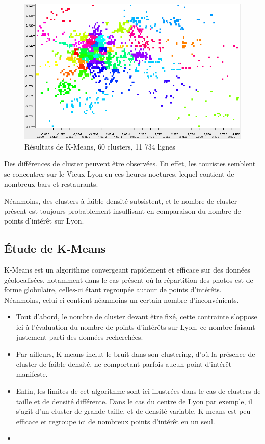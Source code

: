 \begin{figure}[H]
    \centering
    \includegraphics[width=\linewidth]{img/60_means_night.png}
    \caption{Résultats de K-Means, 60 clusters, 11 734 lignes}
\end{figure}

Des différences de cluster peuvent être observées. En effet, les touristes semblent se concentrer sur le Vieux Lyon en ces heures noctures, lequel contient de nombreux bars et restaurants.

Néanmoins, des clusters à faible densité subsistent, et le nombre de cluster présent est toujours probablement insuffisant en comparaison du nombre de points d'intérêt sur Lyon.


\subsection{Étude de K-Means}
K-Means est un algorithme convergeant rapidement et efficace sur des données géolocalisées, notamment dans le cas présent où la répartition des photos est de forme globulaire, celles-ci étant regroupée autour de points d'intérêts.\\

Néanmoins, celui-ci contient néanmoins un certain nombre d'inconvénients.

\begin{itemize}
\item Tout d'abord, le nombre de cluster devant être fixé, cette contrainte s'oppose ici à l'évaluation du nombre de points d'intérêts sur Lyon, ce nombre faisant justement parti des données recherchées.

\item Par ailleurs, K-means inclut le bruit dans son clustering, d'où la présence de cluster de faible densité, ne comportant parfois aucun point d'intérêt manifeste.

\item Enfin, les limites de cet algorithme sont ici illustrées dans le cas de clusters de taille et de densité différente. Dans le cas du centre de Lyon par exemple, il s'agît d'un cluster de grande taille, et de densité variable. K-means est peu efficace et regroupe ici de nombreux points d'intérêt en un seul.\item
\end{itemize}


